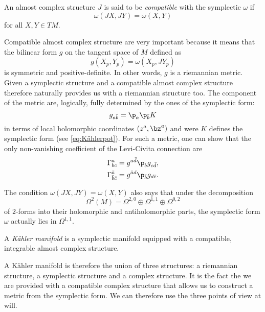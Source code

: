 \documentclass{worksheetclass}
\begin{document}
        \begin{defn}
            An almost complex structure $J$ is said to be \emph{compatible} with the symplectic $\omega$ if 
            \begin{equation*}
                \omega(JX,JY) = \omega(X,Y)
            \end{equation*}
            for all $X,Y\in TM$.
        \end{defn}
        Compatible almost complex structure are very important because it means that the bilinear form $g$ on the tangent space of $M$ defined as
        \begin{equation}
            g(X_p,Y_p)=\omega(X_p,JY_p)
        \end{equation}
        is symmetric and positive-definite. In other words, $g$ is a riemannian metric. Given a symplectic structure and a compatible almost complex structure therefore naturally provides us with a riemannian structure too. The component of the metric are, logically, fully determined by the ones of the symplectic form:
        \begin{equation}
            g_{a\bar{b}}=\p_a\p_{\bar{b}}K
        \end{equation}
        in terms of local holomorphic coordinates $(z^a,\bz^a)$ and were $K$ defines the symplectic form (see \eqref{eq:Kählerpot}). For such a metric, one can show that the only non-vanishing coefficient of the Levi-Civita connection are
        \begin{align}
            \Gamma^a_{bc} &= g^{a\bar{d}}\p_bg_{c\bar{d}},\\
            \Gamma^{\bar{a}}_{\bar{b}\bar{c}} &= g^{\bar{a}d}\p_{\bar{b}}g_{d\bar{c}}.
        \end{align}
        
        The condition $\omega(JX,JY)=\omega(X,Y)$ also says that under the decomposition
        \begin{equation}
            \Omega^2(M) = \Omega^{2,0}\oplus\Omega^{1,1}\oplus\Omega^{0,2}
        \end{equation}
        of $2$-forms into their holomorphic and antiholomorphic parts, the symplectic form $\omega$ actually lies in $\Omega^{1,1}$.
    
        \begin{defn}
            A \emph{Kähler manifold} is a symplectic manifold equipped with a compatible, integrable almost complex structure.
        \end{defn}
        A Kähler manifold is therefore the union of three structures: a riemannian structure, a symplectic structure and a complex structure. It is the fact the we are provided with a compatible complex structure that allows us to construct a metric from the symplectic form. We can therefore use the three points of view at will. 
        
\end{document}
